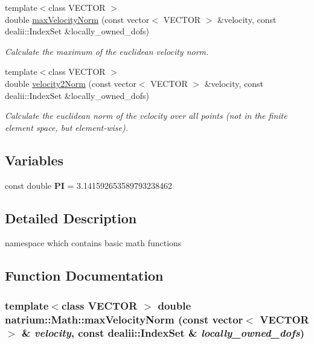 \begin{DoxyCompactItemize}
\item 
{\footnotesize template$<$class VECTOR $>$ }\\double \hyperlink{namespacenatrium_1_1Math_afdfb0b93daae2db1221dc22e268c631d}{maxVelocityNorm} (const vector$<$ VECTOR $>$ \&velocity, const dealii::IndexSet \&locally\_\-owned\_\-dofs)
\begin{DoxyCompactList}\small\item\em Calculate the maximum of the euclidean velocity norm. \item\end{DoxyCompactList}\item 
{\footnotesize template$<$class VECTOR $>$ }\\double \hyperlink{namespacenatrium_1_1Math_ac6abc916cc66dda84a4e5c28e61be560}{velocity2Norm} (const vector$<$ VECTOR $>$ \&velocity, const dealii::IndexSet \&locally\_\-owned\_\-dofs)
\begin{DoxyCompactList}\small\item\em Calculate the euclidean norm of the velocity over all points (not in the finite element space, but element-\/wise). \item\end{DoxyCompactList}\end{DoxyCompactItemize}
\subsection*{Variables}
\begin{DoxyCompactItemize}
\item 
\hypertarget{namespacenatrium_1_1Math_a1ef5edf004cf147f3b3e9d36a7af4b00}{
const double {\bfseries PI} = 3.141592653589793238462}
\label{namespacenatrium_1_1Math_a1ef5edf004cf147f3b3e9d36a7af4b00}

\end{DoxyCompactItemize}


\subsection{Detailed Description}
namespace which contains basic math functions 

\subsection{Function Documentation}
\hypertarget{namespacenatrium_1_1Math_afdfb0b93daae2db1221dc22e268c631d}{
\subsubsection[{maxVelocityNorm}]{\setlength{\rightskip}{0pt plus 5cm}template$<$class VECTOR $>$ double natrium::Math::maxVelocityNorm (const vector$<$ VECTOR $>$ \& {\em velocity}, \/  const dealii::IndexSet \& {\em locally\_\-owned\_\-dofs})}}
\label{namespacenatrium_1_1Math_afdfb0b93daae2db1221dc22e268c631d}


